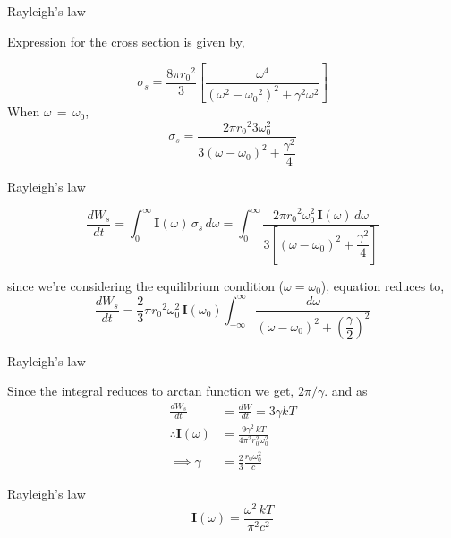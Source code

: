 \documentclass[aspectratio=169]{beamer}
\begin{document}
\begin{frame}{Rayleigh's law}
	\begin{center}
		Expression for the cross section is given by,
	\end{center}
	
	{\large \[ \sigma_s = \frac{8\pi {r_0}^{2}}{3} \left[ \frac{\omega^{4}}{(\omega^2-{\omega_0}^{2})^2+\gamma^2 \omega^2}\right] \]}\newline
	When $ \omega\,=\,\omega_0 $, \newline 		
	{\large \[ \sigma_s = \frac{2\pi {r_0}^{2}{3} \omega_0^{2}}{3(\omega-\omega_0)^2+\dfrac{\gamma^2}{4}} \]}
	
\end{frame}
				
\begin{frame}{Rayleigh's law}

	\[ \frac{dW_s}{dt}=\int_0^{\infty}{\mathbf{I}(\omega)\,\sigma_s \, d\omega} = \int_0^{\infty}{\frac{2\pi {r_0}^{2} \omega_0^{2} \, \mathbf{I}(\omega)\, d\omega}{3 \left[ (\omega-\omega_0)^2+\dfrac{\gamma^2}{4} \right] }} \] \newline

	since we're considering the equilibrium condition ($\omega =\omega_0 $), equation reduces to,
	\[ \frac{dW_s}{dt}= \frac{2}{3}\pi {r_0}^{2} \omega_0^{2} \, \mathbf{I}(\omega_0) \int_{-\infty}^{\infty}{\frac{d\omega}{(\omega-\omega_0)^2+{\left(  \dfrac{\gamma}{2} \right)}^{2}}}  \]

\end{frame}

\begin{frame}{Rayleigh's law}\vspace{1cm}

	Since the integral reduces to arctan function we get, $2\pi / \gamma$. and as 
		\begin{align*}
			\frac{dW_s}{dt} &= \frac{dW}{dt} = 3 \gamma kT \\[2ex]
			\therefore \mathbf{I}(\omega) &= \frac{9\gamma^2\,kT}{4\pi^2 r_0^2\omega_0^2} \\[2ex]
			\implies \gamma &= \frac{2}{3} \frac{r_0 \omega_0^2}{c}
		\end{align*}
	
\end{frame}

\begin{frame}{Rayleigh's law}
	 \[\mathbf{I}(\omega)=\frac{\omega^2\,kT}{\pi^2 c^2} \] 
\end{frame}
\end{document}
